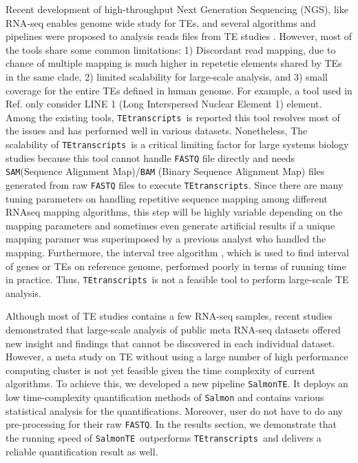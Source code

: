 \documentclass{ws-procs11x85}
\newcommand{\TEtranscripts}{\texttt{TEtranscripts}}
\newcommand{\SalmonTE}{\texttt{SalmonTE}}
\begin{document}
Recent development of high-throughput Next Generation Sequencing (NGS), like RNA-seq
enables genome wide study for TEs\cite{ohtani2013dmgtsf1,mihevc2016tdp,li2012transposable,krug2017retrotransposon}, and several algorithms and pipelines were proposed to analysis reads files from TE studies \cite{lee2012landscape,platzer2012te,helman2014somatic,henaff2015jitterbug,jin2015tetranscripts,de2017identifying,tang2017human}. However, most of the tools share some common limitations: 1) Discordant read mapping, due to chance of multiple mapping is much higher in repetetie elements shared by TEs in the same clade, 2) limited scalability for large-scale analysis, and 3) small coverage for the entire TEs defined in human genome. For example, a tool used in Ref.  only consider LINE 1 (Long Interspersed Nuclear Element 1) element.
\cite{ewing2015transposable} 
Among the existing tools, \TEtranscripts~is reported this tool resolves most of the issues and has performed well in various datasets.
\cite{jin2015tetranscripts}
Nonetheless, The scalability of \TEtranscripts~is a critical limiting factor for large systems biology studies because this tool cannot handle \verb|FASTQ| file directly and needs \verb|SAM|(Sequence Alignment Map)/\verb|BAM| (Binary Sequence Alignment Map) files generated from raw \verb|FASTQ| files to execute \TEtranscripts. Since there are many tuning parameters on handling repetitive sequence mapping among different RNAseq mapping algorithms, this step will be highly variable depending on the mapping parameters and sometimes even generate artificial results if a unique mapping paramer was superimposed by a previous analyst who handled the mapping. 
Furthermore, the interval tree algorithm \cite{samet1990design}, which is used to find interval of genes or TEs on reference genome,  performed poorly in terms of running time in practice. Thus, \TEtranscripts~is not a feasible tool to perform large-scale TE analysis.

Although most of TE studies contains a few RNA-seq samples, recent studies demonstrated that large-scale analysis of public meta RNA-seq datasets offered new insight and
findings that cannot be discovered in each individual dataset. \cite{nellore2016human} However, a meta study on TE without using a large number of high performance computing cluster is not yet feasible given the time complexity of current algorithms.  To achieve this, we developed a new pipeline \SalmonTE. It deploys an low time-complexity quantification methods of \verb|Salmon|\cite{patro2017salmon} and contains various statistical analysis for the quantifications. Moreover, user do not have to do any pre-processing for their raw \verb|FASTQ|. 
In the results section, we demonstrate that the running speed of  \SalmonTE~outperforms \TEtranscripts~and delivers a reliable quantification result as well.
\end{document}
